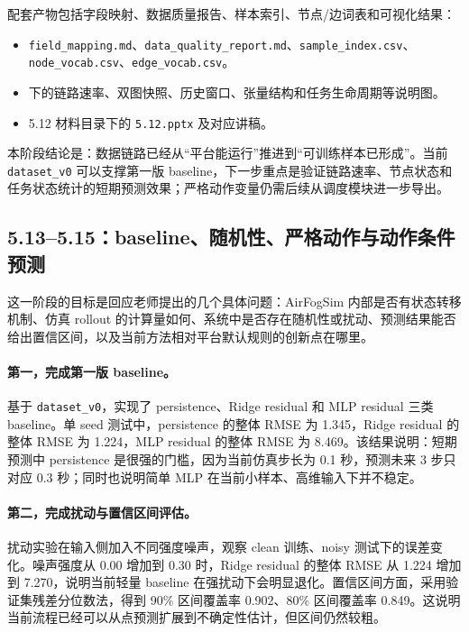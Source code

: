 ﻿\documentclass[UTF8,a4paper,11pt]{ctexart}
\newcommand{\code}[1]{\texttt{#1}}
\begin{document}
配套产物包括字段映射、数据质量报告、样本索引、节点/边词表和可视化结果：

\begin{itemize}
  \item \code{field\_mapping.md}、\code{data\_quality\_report.md}、\code{sample\_index.csv}、\code{node\_vocab.csv}、\code{edge\_vocab.csv}。
  \item {} 下的链路速率、双图快照、历史窗口、张量结构和任务生命周期等说明图。
  \item 5.12 材料目录下的 \code{5.12.pptx} 及对应讲稿。
\end{itemize}

本阶段结论是：数据链路已经从“平台能运行”推进到“可训练样本已形成”。当前 \code{dataset\_v0} 可以支撑第一版 baseline，下一步重点是验证链路速率、节点状态和任务状态统计的短期预测效果；严格动作变量仍需后续从调度模块进一步导出。

\subsection{5.13--5.15：baseline、随机性、严格动作与动作条件预测}

这一阶段的目标是回应老师提出的几个具体问题：AirFogSim 内部是否有状态转移机制、仿真 rollout 的计算量如何、系统中是否存在随机性或扰动、预测结果能否给出置信区间，以及当前方法相对平台默认规则的创新点在哪里。

\paragraph{第一，完成第一版 baseline。}
基于 \code{dataset\_v0}，实现了 persistence、Ridge residual 和 MLP residual 三类 baseline。单 seed 测试中，persistence 的整体 RMSE 为 1.345，Ridge residual 的整体 RMSE 为 1.224，MLP residual 的整体 RMSE 为 8.469。该结果说明：短期预测中 persistence 是很强的门槛，因为当前仿真步长为 0.1 秒，预测未来 3 步只对应 0.3 秒；同时也说明简单 MLP 在当前小样本、高维输入下并不稳定。

\paragraph{第二，完成扰动与置信区间评估。}
扰动实验在输入侧加入不同强度噪声，观察 clean 训练、noisy 测试下的误差变化。噪声强度从 0.00 增加到 0.30 时，Ridge residual 的整体 RMSE 从 1.224 增加到 7.270，说明当前轻量 baseline 在强扰动下会明显退化。置信区间方面，采用验证集残差分位数法，得到 90\% 区间覆盖率 0.902、80\% 区间覆盖率 0.849。这说明当前流程已经可以从点预测扩展到不确定性估计，但区间仍然较粗。
\end{document}
